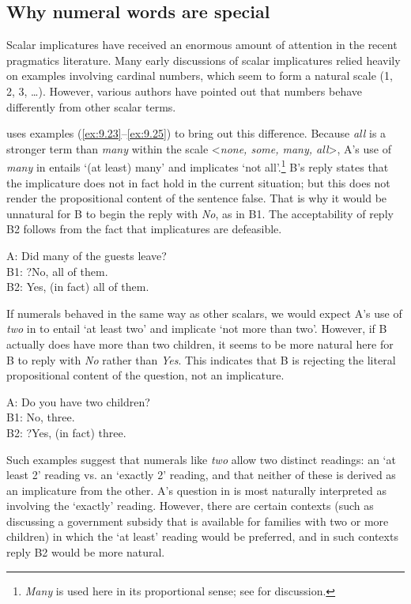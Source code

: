 \subsection{Why numeral words are special}\label{sec:9.4.1}

Scalar implicatures have received an enormous amount of attention in the recent pragmatics literature. Many early discussions of scalar implicatures relied heavily on examples involving cardinal numbers, which seem to form a natural scale (1, 2, 3, …). However, various authors have pointed out that numbers behave differently from other scalar terms.



\citet{Horn2004} uses examples (\ref{ex:9.23}--\ref{ex:9.25}) to bring out this difference. Because \textit{all} is a stronger term than \textit{many} within the scale <\textit{none, some, many, all}>, A’s use of \textit{many} in  entails ‘(at least) many’ and implicates ‘not all’.\footnote{\textit{Many} is used here in its proportional sense; see  for discussion.} B’s reply states that the implicature does not in fact hold in the current situation; but this does not render the propositional content of the sentence false. That is why it would be unnatural for B to begin the reply with \textit{No}, as in B1. The acceptability of reply B2 follows from the fact that implicatures are defeasible.


\ea \label{ex:9.23}
A: Did many of the guests leave?\\
B1: ?No, all of them.\\
B2: Yes, (in fact) all of them.
\z


If numerals behaved in the same way as other scalars, we would expect A’s use of \textit{two} in  to entail ‘at least two’ and implicate ‘not more than two’. However, if B actually does have more than two children, it seems to be more natural here for B to reply with \textit{No} rather than \textit{Yes}. This indicates that B is rejecting the literal propositional content of the question, not an implicature.


\ea \label{ex:9.24}
A: Do you have two children?\\
B1: No, three.\\
B2: ?Yes, (in fact) three.
\z


Such examples suggest that numerals like \textit{two} allow two distinct readings: an ‘at least 2’ reading vs. an ‘exactly 2’ reading, and that neither of these is derived as an implicature from the other. A’s question in  is most naturally interpreted as involving the ‘exactly’ reading. However, there are certain contexts (such as discussing a government subsidy that is available for families with two or more children) in which the ‘at least’ reading would be preferred, and in such contexts reply B2 would be more natural.



